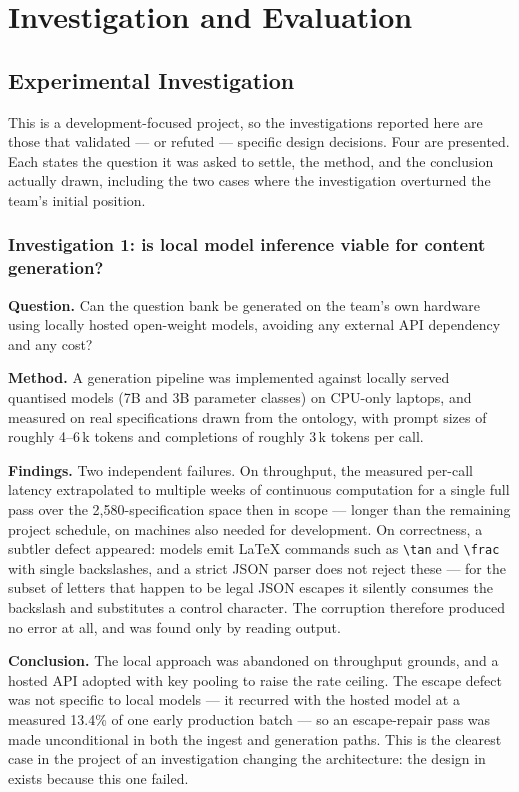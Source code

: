 \chapter{Investigation and Evaluation}
\label{ch:evaluation}

\section{Experimental Investigation}
\label{sec:investigation}

This is a development-focused project, so the investigations reported here are
those that validated --- or refuted --- specific design decisions. Four are
presented. Each states the question it was asked to settle, the method, and the
conclusion actually drawn, including the two cases where the investigation
overturned the team's initial position.

\subsection{Investigation 1: is local model inference viable for content generation?}

\textbf{Question.} Can the question bank be generated on the team's own hardware
using locally hosted open-weight models, avoiding any external API dependency
and any cost?

\textbf{Method.} A generation pipeline was implemented against locally served
quantised models (7B and 3B parameter classes) on CPU-only laptops, and measured
on real specifications drawn from the ontology, with prompt sizes of roughly
4--6\,k tokens and completions of roughly 3\,k tokens per call.

\textbf{Findings.} Two independent failures. On throughput, the measured
per-call latency extrapolated to multiple weeks of continuous computation for a
single full pass over the 2{,}580-specification space then in scope --- longer
than the remaining project schedule, on machines also needed for development. On
correctness, a subtler defect appeared: models emit \LaTeX{} commands such as
\verb|\tan| and \verb|\frac| with single backslashes, and a strict JSON parser
does not reject these --- for the subset of letters that happen to be legal JSON
escapes it silently consumes the backslash and substitutes a control character.
The corruption therefore produced no error at all, and was found only by reading
output.

\textbf{Conclusion.} The local approach was abandoned on throughput grounds, and
a hosted API adopted with key pooling to raise the rate ceiling. The escape
defect was not specific to local models --- it recurred with the hosted model at a
measured 13.4\% of one early production batch --- so an escape-repair pass was
made unconditional in both the ingest and generation paths. This is the clearest
case in the project of an investigation changing the architecture: the design in
 exists because this one failed.

